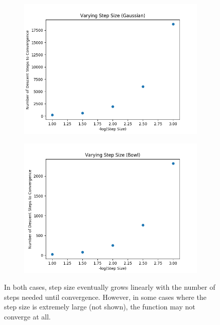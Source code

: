 \documentclass{article}
\begin{document}
\begin{figure}[H]
        \begin{subfigure}[b]{0.5\textwidth}
                \includegraphics[width=\linewidth]{../P1/figs/step_gauss.png}
        \end{subfigure}%
        \begin{subfigure}[b]{0.5\textwidth}
                \includegraphics[width=\linewidth]{../P1/figs/step_bowl.png}
        \end{subfigure}%
\caption*{In both cases, step size eventually grows linearly with the number of steps needed until convergence. However, in some cases where the step size is extremely large (not shown), the function may not converge at all.}
\end{figure}
\end{document}
